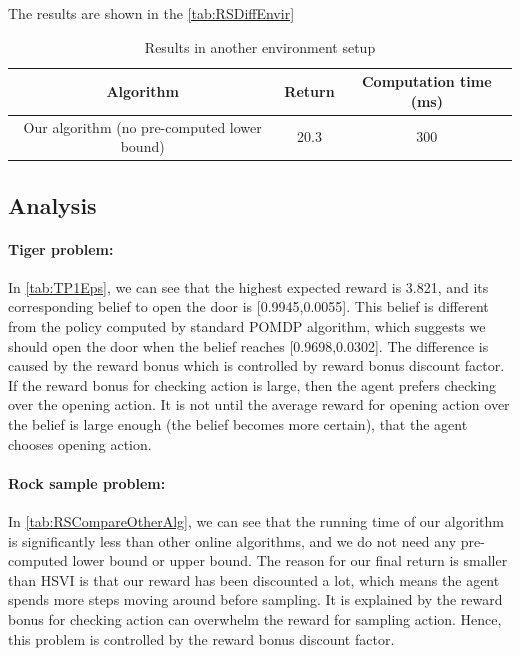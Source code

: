 \documentclass{article}
\begin{document}
The results are shown in the \autoref{tab:RSDiffEnvir}

\begin{table}[H]
\begin{center}
	\begin{tabular} {| c | c | c |}
		\hline \hline
		Algorithm & Return & Computation time (ms) \\
		\hline
		Our algorithm (no pre-computed lower bound) & 20.3 & 300 \\
		\hline \hline
	\end{tabular}
\end{center}
\caption{Results in another environment setup}
\label{tab:RSDiffEnvir}
\end{table}


\subsection{Analysis}

\paragraph{Tiger problem:} 
In \autoref{tab:TP1Eps}, we can see that the highest expected reward is 3.821, and its
corresponding belief to open the door is [0.9945,0.0055]. This belief is different from
the policy computed by standard POMDP algorithm, which suggests we should open the door
when the belief reaches [0.9698,0.0302]. The difference is caused by the reward bonus
which is controlled by reward bonus discount factor. If the reward bonus for checking
action is large, then the agent prefers checking over the opening action. It is not 
until the average reward for opening action over the belief is large enough (the belief
becomes more certain), that the agent chooses opening action.


\paragraph{Rock sample problem:} 
In \autoref{tab:RSCompareOtherAlg}, we can see that
the running time of our algorithm is significantly less than other online algorithms,
and we do not need any pre-computed lower bound or upper bound. The reason for our final
return is smaller than HSVI is that our reward has been discounted a lot, which means the
agent spends more steps moving around before sampling. It is explained by the reward bonus
for checking action can overwhelm the reward for sampling action. Hence, this problem is
controlled by the reward bonus discount factor.
\end{document}
